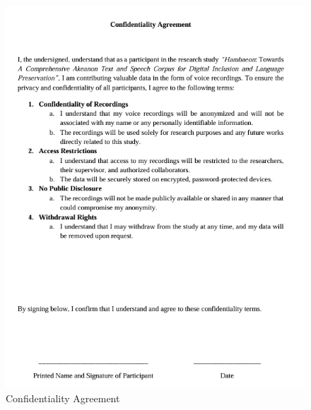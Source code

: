 \begin{figure}[h!]
	\centering
	\includegraphics[width=\textwidth]{./appendix/confidentiality_agreement.png}
	\caption{Confidentiality Agreement}
	\label{fig:confidentialityAgreement}
\end{figure}

